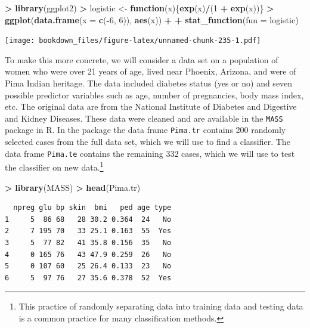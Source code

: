 \documentclass[
]{krantz}
\makeatletter
\newenvironment{Shaded}{\begin{snugshade}}{\end{snugshade}}
\newcommand{\ControlFlowTok}[1]{\textcolor[rgb]{0.27,0.27,0.27}{\textbf{#1}}}
\newcommand{\DataTypeTok}[1]{\textcolor[rgb]{0.27,0.27,0.27}{#1}}
\newcommand{\DecValTok}[1]{\textcolor[rgb]{0.06,0.06,0.06}{#1}}
\newcommand{\KeywordTok}[1]{\textcolor[rgb]{0.27,0.27,0.27}{\textbf{#1}}}
\newcommand{\NormalTok}[1]{#1}
\newcommand{\OperatorTok}[1]{\textcolor[rgb]{0.43,0.43,0.43}{\textbf{#1}}}
\newcommand{\StringTok}[1]{\textcolor[rgb]{0.5,0.5,0.5}{#1}}
\newenvironment{kframe}{%
\medskip{}
\setlength{\fboxsep}{.8em}
 \def\at@end@of@kframe{}%
 \ifinner\ifhmode%
  \def\at@end@of@kframe{\end{minipage}}%
  \begin{minipage}{\columnwidth}%
 \fi\fi%
 \def\FrameCommand##1{\hskip\@totalleftmargin \hskip-\fboxsep
 \colorbox{shadecolor}{##1}\hskip-\fboxsep
     \hskip-\linewidth \hskip-\@totalleftmargin \hskip\columnwidth}%
 \MakeFramed {\advance\hsize-\width
   \@totalleftmargin\z@ \linewidth\hsize
   \@setminipage}}%
 {\par\unskip\endMakeFramed%
 \at@end@of@kframe}
\renewenvironment{Shaded}{\begin{kframe}}{\end{kframe}}
\makeatother
\begin{document}
\begin{Shaded}
\begin{Highlighting}[]
\OperatorTok{\textgreater{}}\StringTok{ }\KeywordTok{library}\NormalTok{(ggplot2)}
\OperatorTok{\textgreater{}}\StringTok{ }\NormalTok{logistic \textless{}{-}}\StringTok{ }\ControlFlowTok{function}\NormalTok{(x)\{}\KeywordTok{exp}\NormalTok{(x)}\OperatorTok{/}\NormalTok{(}\DecValTok{1} \OperatorTok{+}\StringTok{ }\KeywordTok{exp}\NormalTok{(x))\}}
\OperatorTok{\textgreater{}}\StringTok{ }\KeywordTok{ggplot}\NormalTok{(}\KeywordTok{data.frame}\NormalTok{(}\DataTypeTok{x =} \KeywordTok{c}\NormalTok{(}\OperatorTok{{-}}\DecValTok{6}\NormalTok{, }\DecValTok{6}\NormalTok{)), }\KeywordTok{aes}\NormalTok{(x)) }\OperatorTok{+}
\OperatorTok{+}\StringTok{   }\KeywordTok{stat\_function}\NormalTok{(}\DataTypeTok{fun =}\NormalTok{ logistic)}
\end{Highlighting}
\end{Shaded}

\texttt{[image: bookdown\_files/figure-latex/unnamed-chunk-235-1.pdf]}

To make this more concrete, we will consider a data set on a population of women who were over 21 years of age, lived near Phoenix, Arizona, and were of Pima Indian heritage. The data included diabetes status (yes or no) and seven possible predictor variables such as age, number of pregnancies, body mass index, etc. The original data are from the National Institute of Diabetes and Digestive and Kidney Diseases. These data were cleaned and are available in the \texttt{MASS} package in R. In the package the data frame \texttt{Pima.tr} contains 200 randomly selected cases from the full data set, which we will use to find a classifier. The data frame \texttt{Pima.te} contains the remaining 332 cases, which we will use to test the classifier on new data.\footnote{This practice of randomly separating data into training data and testing data is a common practice for many classification methods.}

\begin{Shaded}
\begin{Highlighting}[]
\OperatorTok{\textgreater{}}\StringTok{ }\KeywordTok{library}\NormalTok{(MASS)}
\OperatorTok{\textgreater{}}\StringTok{ }\KeywordTok{head}\NormalTok{(Pima.tr)}
\end{Highlighting}
\end{Shaded}

\begin{verbatim}
  npreg glu bp skin  bmi   ped age type
1     5  86 68   28 30.2 0.364  24   No
2     7 195 70   33 25.1 0.163  55  Yes
3     5  77 82   41 35.8 0.156  35   No
4     0 165 76   43 47.9 0.259  26   No
5     0 107 60   25 26.4 0.133  23   No
6     5  97 76   27 35.6 0.378  52  Yes
\end{verbatim}
\end{document}
